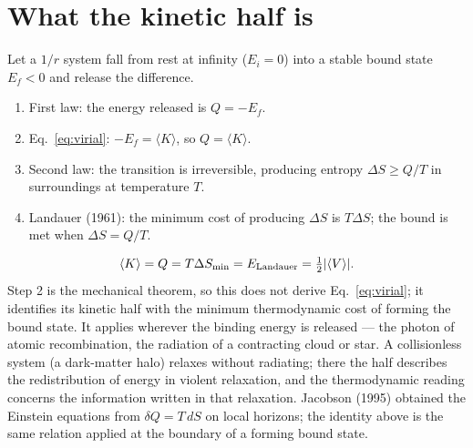 \documentclass[11pt,a4paper]{article}
\begin{document}
\section{What the kinetic half is}
Let a $1/r$ system fall from rest at infinity ($E_i=0$) into a stable bound state $E_f<0$ and release the difference.
\begin{enumerate}
\item First law: the energy released is $Q=-E_f$.
\item Eq.~\eqref{eq:virial}: $-E_f=\langle K\rangle$, so $Q=\langle K\rangle$.
\item Second law: the transition is irreversible, producing entropy $\Delta S\ge Q/T$ in surroundings at temperature $T$.
\item Landauer (1961): the minimum cost of producing $\Delta S$ is $T\Delta S$; the bound is met when $\Delta S=Q/T$.
\end{enumerate}
\begin{equation}
\langle K\rangle=Q=T\Delta S_{\min}=E_{\rm Landauer}=\tfrac12|\langle V\rangle| .
\end{equation}
Step 2 is the mechanical theorem, so this does not derive Eq.~\eqref{eq:virial}; it identifies its kinetic half with the minimum thermodynamic cost of forming
the bound state. It applies wherever the binding energy is released --- the photon of atomic recombination, the radiation of a contracting cloud or star.
A collisionless system (a dark-matter halo) relaxes without radiating; there the half describes the redistribution of energy in violent relaxation, and the
thermodynamic reading concerns the information written in that relaxation. Jacobson (1995) obtained the Einstein equations from $\delta Q=T\,dS$ on local
horizons; the identity above is the same relation applied at the boundary of a forming bound state.
\end{document}
